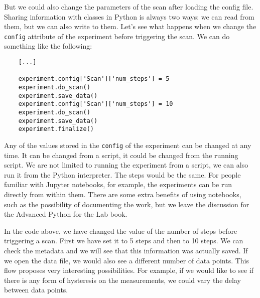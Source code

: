 But we could also change the parameters of the scan after loading the config file. Sharing information with classes in Python is always two ways: we can read from them, but we can also write to them. Let's see what happens when we change the \texttt{config} attribute of the experiment before triggering the scan. We can do something like the following:

\begin{verbatim}
    [...]

    experiment.config['Scan']['num_steps'] = 5
    experiment.do_scan()
    experiment.save_data()
    experiment.config['Scan']['num_steps'] = 10
    experiment.do_scan()
    experiment.save_data()
    experiment.finalize()
\end{verbatim}

Any of the values stored in the \texttt{config} of the experiment can be changed at any time. It can be changed from a script, it could be changed from the running script. We are not limited to running the experiment from a script, we can also run it from the Python interpreter. The steps would be the same. For people familiar with Jupyter notebooks, for example, the experiments can be run directly from within them. There are some extra benefits of using notebooks, such as the possibility of documenting the work, but we leave the discussion for the Advanced Python for the Lab book.


In the code above, we have changed the value of the number of steps before triggering a scan. First we have set it to 5 steps and then to 10 steps. We can check the metadata and we will see that this information was actually saved. If we open the data file, we would also see a different number of data points. This flow proposes very interesting possibilities. For example, if we would like to see if there is any form of hysteresis on the measurements, we could vary the delay between data points.


